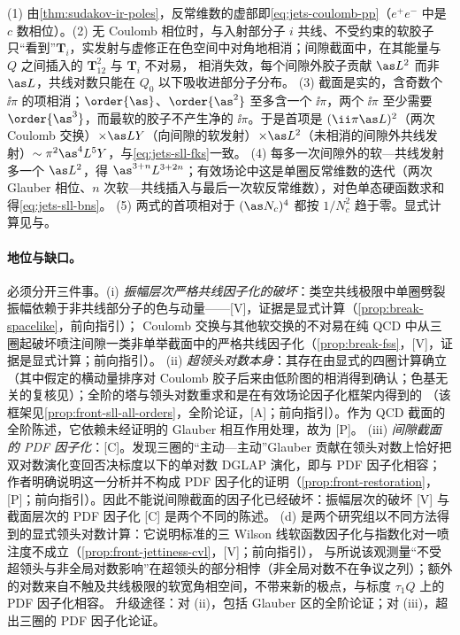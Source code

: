\begin{proofsketch}
(1) 由\cref{thm:sudakov-ir-poles}，反常维数的虚部即\cref{eq:jets-coulomb-pp}（$e^+e^-$ 中是 $c$ 数相位）。(2) 无 Coulomb 相位时，与入射部分子 $i$ 共线、不受约束的软胶子只“看到”$\bm T_i$，实发射与虚修正在色空间中对角地相消；间隙截面中，在其能量与 $Q$ 之间插入的 $\bm T_{12}^2$ 与 $\bm T_i$ 不对易，
相消失效，每个间隙外胶子贡献 $\as L^2$ 而非 $\as L$，共线对数只能在 $Q_0$ 以下吸收进部分子分布\cite{ForshawKyrieleisSeymour2006}。
(3) 截面是实的，含奇数个 $\ii\pi$ 的项相消；$\order{\as}$、$\order{\as^2}$ 至多含一个 $\ii\pi$，两个 $\ii\pi$ 至少需要 $\order{\as^3}$，而最软的胶子不产生净的 $\ii\pi$\cite{ForshawKyrieleisSeymour2006}。于是首项是 $(\ii\pi\as L)^2$（两次 Coulomb 交换）$\times\as LY$（向间隙的软发射）$\times\as L^2$（未相消的间隙外共线发射）$\sim\pi^2\as^4L^5Y$，与\cref{eq:jets-sll-fks}一致。
(4) 每多一次间隙外的软—共线发射多一个 $\as L^2$，得 $\as^{3+n}L^{3+2n}$；有效场论中这是单圈反常维数的迭代（两次 Glauber 相位、$n$ 次软—共线插入与最后一次软反常维数\cite{Becher:2021zkk}），对色单态硬函数求和得\cref{eq:jets-sll-bns}。
(5) 两式的首项相对于 $(\as N_c)^4$ 都按 $1/N_c^2$ 趋于零。显式计算见\cite[第~3~节]{ForshawKyrieleisSeymour2006}与\cite{Forshaw:2008cq}。
\end{proofsketch}

\paragraph{地位与缺口。}
必须分开三件事。(i) \emph{振幅层次严格共线因子化的破坏}：类空共线极限中单圈劈裂振幅依赖于非共线部分子的色与动量——[V]，证据是显式计算（\cref{prop:break-spacelike}，前向指引）；
Coulomb 交换与其他软交换的不对易在纯 QCD 中从三圈起破坏喷注间隙一类非单举截面中的严格共线因子化（\cref{prop:break-fss}，[V]，证据是显式计算；前向指引）。
(ii) \emph{超领头对数本身}：其存在由显式的四圈计算确立\cite{ForshawKyrieleisSeymour2006}（其中假定的横动量排序对 Coulomb 胶子后来由低阶图的相消得到确认\cite{Angeles-Martinez:2015rna}；色基无关的复核见\cite{Forshaw:2008cq}）；全阶的塔与领头对数重求和是在有效场论因子化框架内得到的
\cite{Becher:2021zkk,Becher:2023mtx,Boer:2024hzh,Becher:2024nqc}（该框架见\cref{prop:front-sll-all-orders}，全阶论证，[A]；前向指引）。作为 QCD 截面的全阶陈述，它依赖未经证明的 Glauber 相互作用处理，故为 [P]。
(iii) \emph{间隙截面的 PDF 因子化}：[C]。\cite{Becher:2024kmk}发现三圈的“主动—主动”Glauber 贡献在领头对数上恰好把双对数演化变回否决标度以下的单对数 DGLAP 演化，即与 PDF 因子化相容；
作者明确说明这一分析并不构成 PDF 因子化的证明（\cref{prop:front-restoration}，[P]；前向指引）。因此不能说间隙截面的因子化已经破坏：振幅层次的破坏 [V] 与截面层次的 PDF 因子化 [C] 是两个不同的陈述。
(d) 是两个研究组以不同方法得到的显式领头对数计算\cite{Banfi:2025mra,Becher:2026kbr}：它说明标准的三 Wilson 线软函数因子化与指数化对一喷注度不成立（\cref{prop:front-jettiness-cvl}，[V]；前向指引），
与\cite{Alioli:2023rxx}所说该观测量“不受超领头与非全局对数影响”在超领头的部分相悖（非全局对数不在争议之列）；额外的对数来自不触及共线极限的软宽角相空间，不带来新的极点，与标度 $\tau_1Q$ 上的 PDF 因子化相容\cite{Banfi:2025mra}。
升级途径：对 (ii)，包括 Glauber 区的全阶论证；对 (iii)，超出三圈的 PDF 因子化论证。
